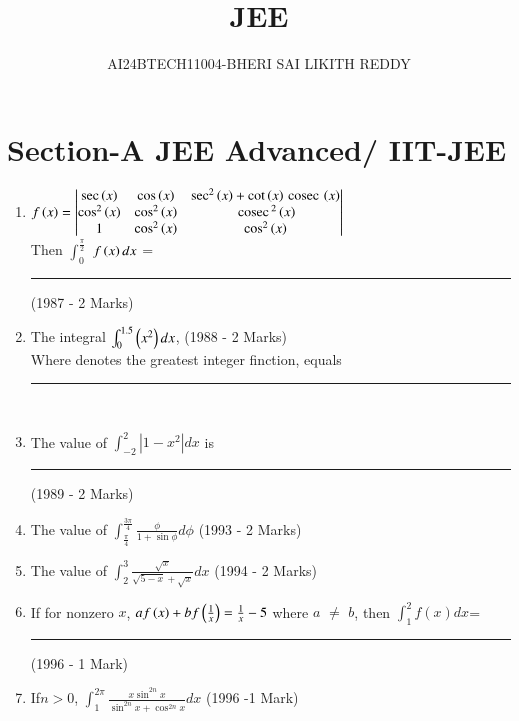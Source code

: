 \documentclass[journal,12pt,twocolumn]{IEEEtran}
\theoremstyle{remark}
\begin{document}


\title{JEE}
\author{AI24BTECH11004-BHERI SAI LIKITH REDDY}
\maketitle
\newpage
\bigskip

\renewcommand{\thefigure}{\theenumi}
\renewcommand{\thetable}{\theenumi}

\section{Section-A JEE Advanced/ IIT-JEE}
\begin{enumerate}
	\item $f\left(x\right) = \begin{vmatrix}
			\sec\left(x\right) & \cos\left(x\right) & \sec^2\left(x\right) + \cot\left(x\right) \,\text{cosec}\, \left(x\right)\\
		\cos^2\left(x\right) & \cos^2\left(x\right) & \,\text{cosec}\,^2\left(x\right)\\
		1 & \cos^2\left(x\right) & \cos^2\left(x\right)\end{vmatrix}$\\
	Then $\int_0^{\frac{\pi}{2}}$ $f\left(x\right)dx$ = \rule{1cm}{0.15mm}
\hfill{(1987 - 2 Marks)}\\ 
		
\item The integral $\int_0^{1.5} \left(x^2\right)dx$,
\hfill{(1988 - 2 Marks)}\\
	Where \sbrak denotes the greatest integer finction, equals \rule{1cm}{0.15mm}  \\
		
\item The value of  $\int_{-2}^2 |1-x^2|dx$ is \rule{1cm}{0.15mm}
	\hfill{(1989 - 2 Marks)}\\
		
\item The value of $\int_{\frac{\pi}{4}}^{\frac{3\pi}{4}} \frac{\phi}{1+ \sin \phi} d\phi$
\hfill{(1993 - 2 Marks)}\\
		
\item The value of $\int_2^3 \frac{\sqrt x }{\sqrt {5-x}+\sqrt {x}} dx$
\hfill{(1994 - 2 Marks)}\\
		
\item If for nonzero $x$, $af\left(x\right)+bf \left(\frac{1}{x} \right) = \frac{1}{x}-5 $ where $a$ 
	$\neq$  $b$, then $\int_1^2f(x)dx$= \rule{1cm}{0.15mm}
\hfill{(1996 - 1 Mark)}\\
		
\item If$ n>0$, $\int_1^{2\pi} \frac {x \sin ^{2n}x}{\sin^{2n}x+\cos^{2n} x} dx $
\hfill{(1996 -1 Mark)}\\
		

\end{enumerate}
\end{document}
